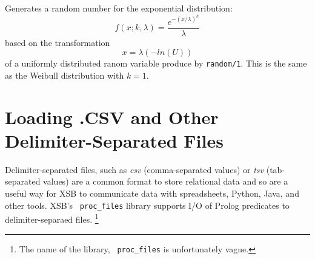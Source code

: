 \begin{description}
%
Generates a random number for the exponential distribution:
\[
  f(x;k,\lambda) = \frac{e^{-(x/\lambda)^h}}{\lambda}
\]
based on the transformation
\[
  x = \lambda(-ln(U))
\]
of a uniformly distributed ranom variable produce by {\tt random/1}.
This is the same as the Weibull distribution with $k = 1$.

\end{description}

\section{Loading .CSV and Other Delimiter-Separated Files} \label{sec:procfiles}


Delimiter-separated files, such as {\em csv} (comma-separated values)
or {\em tsv} (tab-separated values) are a common format to store
relational data and so are a useful way for XSB to communicate data
with spreadsheets, Python, Java, and other tools.  XSB's {\tt
  proc\_files} library supports I/O of Prolog predicates to
delimiter-separaed files. \footnote{The name of the library, {\tt
    proc\_files} is unfortunately vague.}

